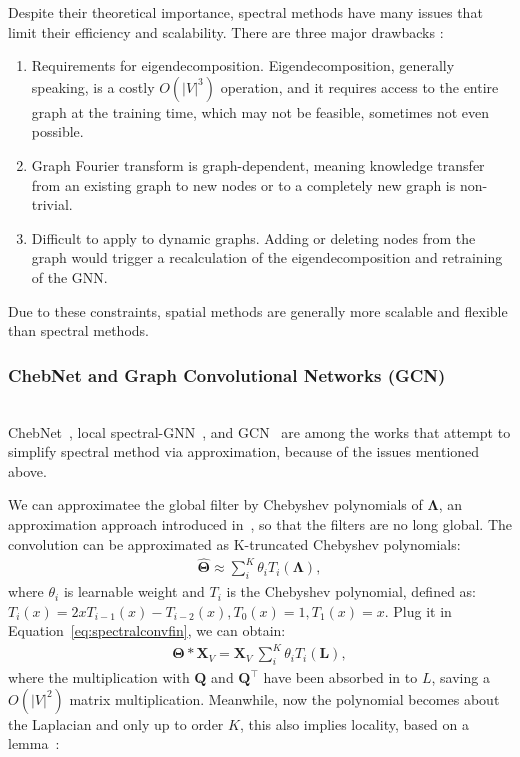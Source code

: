 Despite their theoretical importance, spectral methods have many issues that limit their efficiency and scalability. There are three major drawbacks :
\begin{enumerate}
\item Requirements for eigendecomposition. Eigendecomposition, generally speaking, is a costly $O(|V|^3)$ operation, and it requires access to the entire graph at the training time, which may not be feasible, sometimes not even possible.
\item Graph Fourier transform is graph-dependent, meaning knowledge transfer from an existing graph to new nodes or to a completely new graph is non-trivial.
\item Difficult to apply to dynamic graphs. Adding or deleting nodes from the graph would trigger a recalculation of the eigendecomposition and retraining of the GNN.
\end{enumerate}

Due to these constraints, spatial methods are generally more scalable and flexible than spectral methods. 
\subsubsection{ChebNet and Graph Convolutional Networks (GCN)} \hfill \\
ChebNet~\cite{chebnet}, local spectral-GNN~\cite{hammond}, and GCN~\cite{gcn} are among the works that attempt to simplify spectral method via approximation, because of the issues mentioned above. 

We can approximatee the global filter by Chebyshev polynomials of $\mathbf{\Lambda}$, an approximation approach introduced in~\cite{hammond, chebnet}, so that the filters are no long global. The convolution can be approximated as K-truncated Chebyshev polynomials:
\begin{gather}
\hat {\mathbf{\Theta}} \approx \sum_i^K \theta_i T_i(\mathbf{\Lambda}),
\end{gather}
where $\theta_i$ is learnable weight and $T_i$ is the Chebyshev polynomial, defined as: $T_i(x) = 2xT_{i-1}(x) - T_{i-2}(x), T_0(x) = 1, T_1(x) = x$. Plug it in Equation~\ref{eq:spectralconvfin}, we can obtain:
\begin{gather}
\mathbf{\Theta} \ast \mathbf{X}_V = \mathbf{X}_V~\sum_i^K \theta_i T_i(\mathbf{L}),
\end{gather}
where the multiplication with $\mathbf{Q}$ and $\mathbf{Q}^\intercal$ have been absorbed in to $L$, saving a $O(|V|^2)$ matrix multiplication. Meanwhile, now the polynomial becomes about the Laplacian and only up to order $K$, this also implies locality, based on a lemma~\cite{hammond}:

